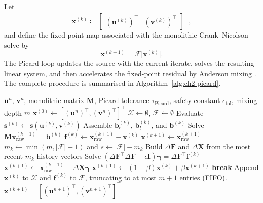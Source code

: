 Let
\[
    \mathbf{x}^{(k)}
    \coloneqq
    \begin{bmatrix}
        (\mathbf{u}^{(k)})^\top &
        (\mathbf{v}^{(k)})^\top
    \end{bmatrix}^\top,
\]
and define the fixed-point map associated with the monolithic Crank--Nicolson solve by
\begin{equation}
    \mathbf{x}^{(k+1)} = \mathcal{F}\bigl[\mathbf{x}^{(k)}\bigr].
\end{equation}
The Picard loop updates the source with the current iterate, solves the resulting linear system, and then accelerates the fixed-point residual by Anderson mixing \cite{Pollock_2018}. The complete procedure is summarised in Algorithm~\ref{alg:ch2-picard}.

\begin{algorithm}[htbp]
    \caption{Monolithic Picard with Anderson acceleration}
    \label{alg:ch2-picard}
    \begin{algorithmic}[1]
        \Require $\mathbf{u}^n$, $\mathbf{v}^n$, monolithic matrix $\mathbf{M}$, Picard tolerance $\tau_{\mathrm{Picard}}$, safety constant $\epsilon_{\mathrm{tol}}$, mixing depth $m$
        \State $\mathbf{x}^{(0)} \gets [(\mathbf{u}^n)^\top, (\mathbf{v}^n)^\top]^\top$
        \State $\mathcal{X} \gets \emptyset$, $\mathcal{F} \gets \emptyset$
        \State Evaluate $\mathbf{s}^{(k)} \gets \mathbf{s}(\mathbf{u}^{(k)}, \mathbf{v}^{(k)})$
        \State Assemble $\mathbf{b}_e^{(k)}$, $\mathbf{b}_l^{(k)}$, and $\mathbf{b}^{(k)}$
        \State Solve $\mathbf{M}\mathbf{x}^{(k+1)}_{\mathrm{raw}} = \mathbf{b}^{(k)}$
        \State $\mathbf{f}^{(k)} \gets \mathbf{x}^{(k+1)}_{\mathrm{raw}} - \mathbf{x}^{(k)}$
        \State $\mathbf{x}^{(k+1)} \gets \mathbf{x}^{(k+1)}_{\mathrm{raw}}$
        \Else
        \State $m_k \gets \min(m, |\mathcal{F}|-1)$ and $s \gets |\mathcal{F}|-m_k$
        \State Build $\Delta \mathbf{F}$ and $\Delta \mathbf{X}$ from the most recent $m_k$ history vectors
        \State Solve $(\Delta \mathbf{F}^\top \Delta \mathbf{F} + \epsilon \mathbf{I})\boldsymbol{\gamma} = \Delta \mathbf{F}^\top \mathbf{f}^{(k)}$
        \State $\mathbf{x}^{(k+1)} \gets \mathbf{x}^{(k+1)}_{\mathrm{raw}} - \Delta \mathbf{X}\boldsymbol{\gamma}$
        \State $\mathbf{x}^{(k+1)} \gets (1-\beta)\mathbf{x}^{(k)} + \beta \mathbf{x}^{(k+1)}$
        \EndIf
        \State \textbf{break}
        \EndIf
        \State Append $\mathbf{x}^{(k)}$ to $\mathcal{X}$ and $\mathbf{f}^{(k)}$ to $\mathcal{F}$, truncating to at most $m+1$ entries (FIFO).
        \EndFor
        \Ensure $\mathbf{x}^{(k+1)} = [(\mathbf{u}^{n+1})^\top, (\mathbf{v}^{n+1})^\top]^\top$
    \end{algorithmic}
\end{algorithm}


